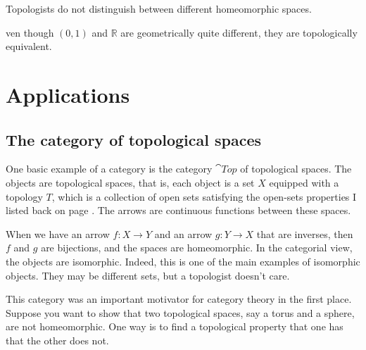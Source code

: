 \documentclass{article}
\def\R{{\mathbb R}}
\newcounter{exercisecounter}\setcounter{exercisecounter}{1}
\def\Exercise.#1\par{{\item\small {\bf Exercise \number\theexercisecounter}.#1\addtocounter{exercisecounter}{1}}}
\begin{document}
Topologists do not distinguish between different homeomorphic
spaces.

\begin{itemize}
\Exercise.  Even though $(0,1)$ and $\R$ are geometrically quite
different, they are topologically equivalent.

\end{itemize}

\section*{Applications}

\subsection*{The category of topological spaces}

One basic example of a category is the category $\cat{Top}$ of
topological spaces.  The objects are topological spaces, that is, each
object is a set $X$ equipped with a topology $T$, which is a
collection of open sets satisfying the open-sets properties I listed
back on page \pageref{topology-def}.  The arrows are continuous
functions between these spaces.

When we have an arrow $f : X\to Y$ and an arrow $g : Y\to X$ that are
inverses, then $f$ and $g$ are bijections, and the spaces are
homeomorphic.  In the categorial view, the objects are isomorphic.
Indeed, this is one of the main examples of isomorphic objects.  They
may be different sets, but a topologist doesn't care.  


This category was an important motivator for category theory in the
first place.  Suppose you want to show that two topological spaces,
say a torus and a sphere, are not homeomorphic.  One way is to find a
topological property that one has that the other does not.  
\end{document}
